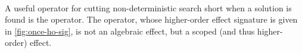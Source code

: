 \begin{code}[hide]%
%
\>[6]\AgdaSpace{}%
\AgdaSpace{}%
\AgdaSpace{}%
\AgdaSpace{}%
\AgdaSpace{}%
\AgdaSpace{}%
\AgdaSymbol{=}\AgdaSpace{}%
\AgdaSymbol{(}\AgdaSpace{}%
\AgdaSymbol{)}\AgdaSpace{}%
\AgdaSpace{}%
\AgdaSymbol{(}\AgdaSpace{}%
\AgdaSpace{}%
\AgdaSpace{}%
\AgdaSymbol{)}\<%
\\
\>[6][@{}l@{\AgdaIndent{0}}]%
\>[8]\AgdaSpace{}%
\AgdaSpace{}%
\AgdaSpace{}%
\AgdaSpace{}%
\AgdaSymbol{(}\AgdaSpace{}%
\AgdaSpace{}%
\AgdaSymbol{)}\<%
\\
%
\\[\AgdaEmptyExtraSkip]%
%
\>[6]\AgdaSpace{}%
\AgdaSpace{}%
\AgdaSpace{}%
\AgdaSpace{}%
\AgdaSymbol{=}\AgdaSpace{}%
\AgdaSymbol{(}\AgdaSpace{}%
\AgdaSymbol{)}\AgdaSpace{}%
\AgdaSpace{}%
\<%
\\
\>[6][@{}l@{\AgdaIndent{0}}]%
\>[8]\AgdaSpace{}%
\AgdaSpace{}%
\AgdaSpace{}%
\AgdaSpace{}%
\AgdaSymbol{(}\AgdaSpace{}%
\AgdaSpace{}%
\AgdaSymbol{)}\<%
\\
%
\\[\AgdaEmptyExtraSkip]%
%
\>[6]\AgdaSpace{}%
\AgdaModule{\AgdaUnderscore{}}\AgdaSpace{}%
\AgdaSpace{}%
\AgdaSpace{}%
\AgdaSymbol{:}\AgdaSpace{}%
\AgdaSpace{}%
\AgdaSpace{}%
\<%
\end{code}
A useful operator for cutting non-deterministic search short when a solution is found is the  operator.
The  operator, whose higher-order effect signature is given in \cref{fig:once-ho-sig}, is not an algebraic effect, but a scoped (and thus higher-order) effect.
